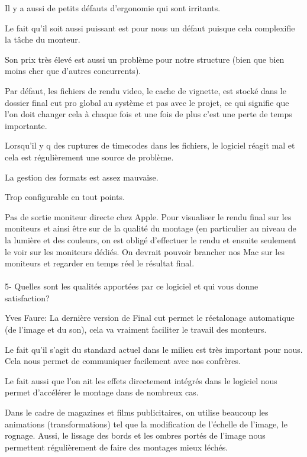 Il y a aussi de petits défauts d'ergonomie qui sont irritants.

Le fait qu'il soit aussi puissant est pour nous un défaut puisque cela
complexifie la tâche du monteur.

Son prix très élevé est aussi un problème pour notre structure (bien que bien
moins cher que d'autres concurrents).

Par défaut, les fichiers de rendu video, le cache de vignette, est stocké dans
le dossier final cut pro global au  système et pas avec le projet, ce qui
signifie que l'on doit changer cela à chaque fois et une fois de plus c'est une
perte de temps importante.

Lorsqu'il y q des ruptures de timecodes dans les fichiers, le logiciel réagit mal
et cela est régulièrement une source de problème.

La gestion des formats est assez mauvaise.

Trop configurable en tout points.

Pas de sortie moniteur directe chez Apple. Pour visualiser le rendu final sur les
moniteurs et ainsi être sur de la qualité du montage (en particulier au niveau de
la lumière et des couleurs, on est obligé d'effectuer le rendu et ensuite
seulement le voir sur les moniteurs dédiés. On devrait pouvoir brancher nos Mac
sur les moniteurs et regarder en temps réel le résultat final.

\paragraph{}
5- Quelles sont les qualités apportées par ce logiciel et qui vous donne satisfaction?

Yves Faure: La dernière version de Final cut permet le réetalonage automatique (de l'image
et du son), cela va vraiment faciliter le travail des monteurs.

Le fait qu'il s'agit du standard actuel dans le milieu est très important pour
nous. Cela nous permet de communiquer facilement avec nos confrères.

Le fait aussi que l'on ait les effets directement intégrés dans le logiciel nous
permet d'accélérer le montage dans de nombreux cas.

Dans le cadre de magazines et films publicitaires, on utilise beaucoup les
animations (transformations) tel que la modification de l'échelle de l'image,
le rognage. Aussi, le lissage des bords et les ombres portés de l'image nous
permettent régulièrement de faire des montages mieux léchés.


